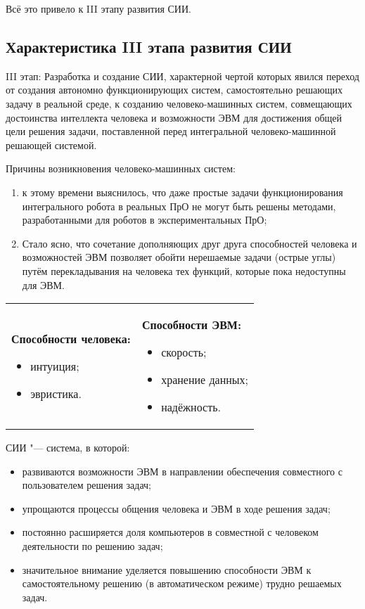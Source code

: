 Всё это привело к III этапу развития СИИ.

\subsection{Характеристика III этапа развития СИИ}
III этап: Разработка и создание СИИ, характерной чертой которых
явился переход от создания автономно функционирующих систем,
самостоятельно решающих задачу в реальной среде, к созданию
человеко-машинных систем, совмещающих достоинства интеллекта человека
и возможности ЭВМ для достижения общей цели решения задачи,
поставленной перед интегральной человеко-машинной решающей системой.

Причины возникновения человеко-машинных систем:
\begin{enumerate}
\item к этому времени выяснилось, что даже простые задачи
  функционирования интегрального робота в реальных ПрО не могут быть
  решены методами, разработанными для роботов в экспериментальных ПрО;
\item Стало ясно, что сочетание дополняющих друг друга способностей
  человека и возможностей ЭВМ позволяет обойти нерешаемые задачи
  (острые углы) путём перекладывания на человека тех функций, которые
  пока недоступны для ЭВМ.
\end{enumerate} 

\begin{table}[ht]
  \centering
  \begin{tabular}{p{.35\linewidth}|@{\qquad}p{.35\linewidth}}
    \textbf{Способности человека:}
    \begin{itemize}
    \item интуиция;
    \item эвристика.
    \end{itemize}
   & 
    \textbf{Способности ЭВМ:}
     \begin{itemize}
    \item скорость;
    \item хранение данных;
    \item надёжность.
    \end{itemize}
  
    \end{tabular}
\end{table}

СИИ "--- система, в которой:
\begin{itemize}
\item развиваются возможности ЭВМ в направлении обеспечения
  совместного с пользователем решения задач;
\item упрощаются процессы общения человека и ЭВМ в ходе решения задач;
\item постоянно расширяется доля компьютеров в совместной с человеком
  деятельности по решению задач;
\item значительное внимание уделяется повышению способности ЭВМ к
  самостоятельному решению (в автоматическом режиме) трудно решаемых
  задач.
\end{itemize}

